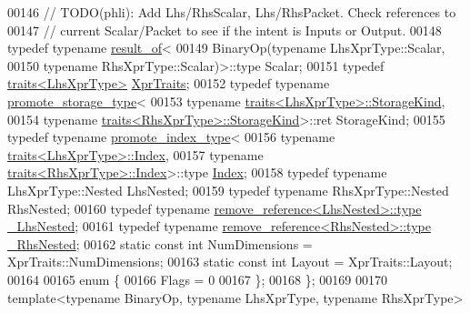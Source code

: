 \begin{DoxyCode}
00146   \textcolor{comment}{// TODO(phli): Add Lhs/RhsScalar, Lhs/RhsPacket.  Check references to}
00147   \textcolor{comment}{// current Scalar/Packet to see if the intent is Inputs or Output.}
00148   \textcolor{keyword}{typedef} \textcolor{keyword}{typename} \hyperlink{struct_eigen_1_1internal_1_1result__of}{result\_of}<
00149       BinaryOp(\textcolor{keyword}{typename} LhsXprType::Scalar,
00150                \textcolor{keyword}{typename} RhsXprType::Scalar)>::type Scalar;
00151   \textcolor{keyword}{typedef} \hyperlink{struct_eigen_1_1internal_1_1traits}{traits<LhsXprType>} \hyperlink{struct_eigen_1_1internal_1_1traits}{XprTraits};
00152   \textcolor{keyword}{typedef} \textcolor{keyword}{typename} \hyperlink{struct_eigen_1_1internal_1_1promote__storage__type}{promote\_storage\_type}<
00153       \textcolor{keyword}{typename} \hyperlink{struct_eigen_1_1internal_1_1traits}{traits<LhsXprType>::StorageKind},
00154       \textcolor{keyword}{typename} \hyperlink{struct_eigen_1_1internal_1_1traits}{traits<RhsXprType>::StorageKind}>::ret StorageKind;
00155   \textcolor{keyword}{typedef} \textcolor{keyword}{typename} \hyperlink{struct_eigen_1_1internal_1_1promote__index__type}{promote\_index\_type}<
00156       \textcolor{keyword}{typename} \hyperlink{struct_eigen_1_1internal_1_1traits}{traits<LhsXprType>::Index},
00157       \textcolor{keyword}{typename} \hyperlink{struct_eigen_1_1internal_1_1traits}{traits<RhsXprType>::Index}>::type \hyperlink{namespace_eigen_a62e77e0933482dafde8fe197d9a2cfde}{Index};
00158   \textcolor{keyword}{typedef} \textcolor{keyword}{typename} LhsXprType::Nested LhsNested;
00159   \textcolor{keyword}{typedef} \textcolor{keyword}{typename} RhsXprType::Nested RhsNested;
00160   \textcolor{keyword}{typedef} \textcolor{keyword}{typename} \hyperlink{group___sparse_core___module}{remove\_reference<LhsNested>::type} 
      \hyperlink{group___sparse_core___module}{\_LhsNested};
00161   \textcolor{keyword}{typedef} \textcolor{keyword}{typename} \hyperlink{group___sparse_core___module}{remove\_reference<RhsNested>::type} 
      \hyperlink{group___sparse_core___module}{\_RhsNested};
00162   \textcolor{keyword}{static} \textcolor{keyword}{const} \textcolor{keywordtype}{int} NumDimensions = XprTraits::NumDimensions;
00163   \textcolor{keyword}{static} \textcolor{keyword}{const} \textcolor{keywordtype}{int} Layout = XprTraits::Layout;
00164 
00165   \textcolor{keyword}{enum} \{
00166     Flags = 0
00167   \};
00168 \};
00169 
00170 \textcolor{keyword}{template}<\textcolor{keyword}{typename} BinaryOp, \textcolor{keyword}{typename} LhsXprType, \textcolor{keyword}{typename} RhsXprType>

\end{DoxyCode}
